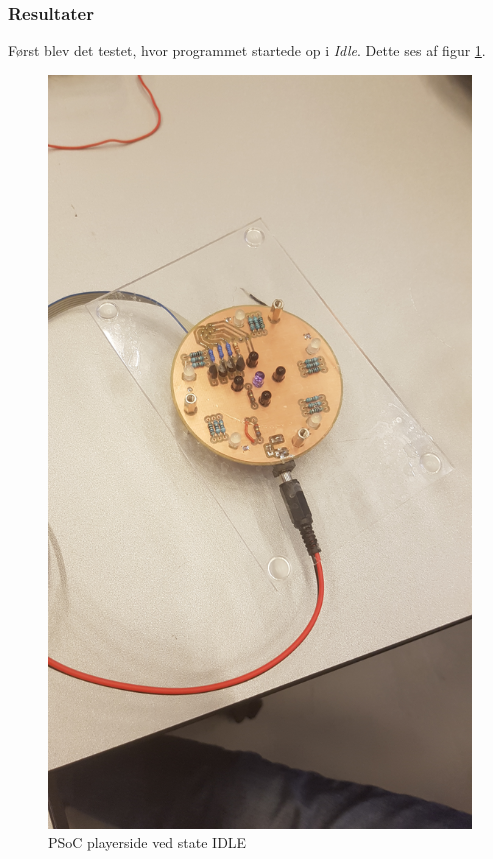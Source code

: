 \documentclass[Integrationstest/Integrationstest_main.tex]{subfiles}
\begin{document}
\subsubsection{Resultater}
Først blev det testet, hvor programmet startede op i \textit{Idle}. Dette ses af figur \ref{fig:int_playerside_idle}.
\begin{figure}[H]
    \centering
    \includegraphics[width=\textwidth]{Integrationstest/Integrationstest_PlayerSide/graphics/CupSensorInt/IDLE.jpg}
    \caption{PSoC playerside ved state IDLE}
    \label{fig:int_playerside_idle}
\end{figure}
\end{document}
